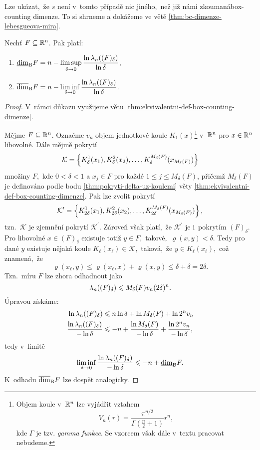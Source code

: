 Lze ukázat,~že $s$ není v~tomto případě nic jiného,~než již námi zkoumaná\linebreak{}box-counting dimenze. To si shrneme a dokážeme ve větě \ref{thm:bc-dimenze-lebesgueova-mira}.
\begin{theorem}\label{thm:bc-dimenze-lebesgueova-mira}
    Nechť $F\subseteq\mathbb{R}^n$. Pak platí: 
    \begin{enumerate}[label=(\roman*)]
        \item $\underline{\dim}_\textup{B}{F}=n-\limsup\limits_{\delta\to 0}\dfrac{\ln{\ensuremath{\lambda_n}((F)_\delta)}}{\ln{\delta}}$,
        \item $\overline{\dim}_\textup{B}{F}=n-\liminf\limits_{\delta\to 0}\dfrac{\ln{\ensuremath{\lambda_n}((F)_\delta)}}{\ln{\delta}}$.
    \end{enumerate}
\end{theorem}
\begin{proof}
    V~rámci důkazu využijeme větu \ref{thm:ekvivalentni-def-box-counting-dimenze}.

    Mějme $F\subseteq\mathbb{R}^n$. Označme $v_n$ objem jednotkové koule $K_1(x)$\footnote{Objem koule v~$\mathbb{R}^n$ lze vyjádřit vztahem
    \[V_n(r)=\dfrac{\pi^{n/2}}{\Gamma\left(\frac{n}{2}+1\right)}r^n,\]
    kde $\Gamma$ je tzv. \emph{gamma funkce}. Se vzorcem však dále v~textu pracovat nebudeme.
    } v~$\mathbb{R}^n$ pro $x\in\mathbb{R}^n$ libovolné. Dále mějmě pokrytí
    \[\mathcal{K}=\left\{K_\delta^1(x_1),K_\delta^2(x_2),\ldots,K_\delta^{M_\delta(F)}(x_{M_\delta(F)})\right\}\]
    množiny $F$,~kde $0<\delta<1$ a $x_j\in F$ pro každé $1\leqslant j\leqslant M_\delta(F)$, přičemž $M_\delta(F)$ je definováno podle bodu \ref{thm:pokryti-delta-uz-koulemi} věty \ref{thm:ekvivalentni-def-box-counting-dimenze}. Pak lze zvolit pokrytí
    \[\mathcal{K}^\prime=\left\{K_{2\delta}^1(x_1),K_{2\delta}^2(x_2),\ldots,K_{2\delta}^{M_\delta(F)}(x_{M_\delta(F)})\right\},\]
    tzn.~$\mathcal{K}$ je zjemnění pokrytí $\mathcal{K}^\prime$. Zároveň však platí,~že $\mathcal{K}^\prime$ je i~pokrytím $(F)_\delta$. Pro libovolné $x\in (F)_\delta$ existuje totiž $y\in F$,~takové,~$\varrho(x,y)<\delta$. Tedy pro dané $y$ existuje nějaká koule $K_\ell(x_\ell)\in\mathcal{K}$,~taková,~že $y\in K_\ell(x_\ell)$,~což znamená,~že
    \[\varrho(x_\ell,y)\leqslant\varrho(x_\ell,x)+\varrho(x,y)\leqslant\delta+\delta=2\delta.\]
    Tzn.~míru $F$ lze zhora odhadnout jako
    \[\lambda_n((F)_\delta)\leqslant M_\delta(F)v_n(2\delta)^n.\]
    Úpravou získáme:
    \begin{align*}
        \ln{\ensuremath{\lambda_n}((F)_\delta)}&\leqslant n\ln{\delta}+\ln{M_\delta(F)}+\ln{2^nv_n}\\
        \dfrac{\ln{\ensuremath{\lambda_n}((F)_\delta)}}{-\ln\delta}&\leqslant -n+\dfrac{\ln{M_\delta(F)}}{-\ln\delta}+\dfrac{\ln{2^nv_n}}{-\ln\delta},
    \end{align*}
    tedy v~limitě
    \[\liminf_{\delta\to 0}\dfrac{\ln\lambda_n((F)_\delta)}{-\ln\delta}\leqslant -n+\underline{\dim}_\textup{B}{F}.\]
    K~odhadu $\overline{\dim}_\textup{B}{F}$ lze dospět analogicky.


\end{proof}
